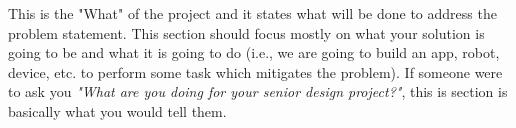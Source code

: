 This is the "What" of the project and it states what will be done to address the problem statement. This section should focus mostly on what your solution is going to be and what it is going to do (i.e., we are going to build an app, robot, device, etc. to perform some task which mitigates the problem). If someone were to ask you \textit{"What are you doing for your senior design project?"}, this is section is basically what you would tell them. 